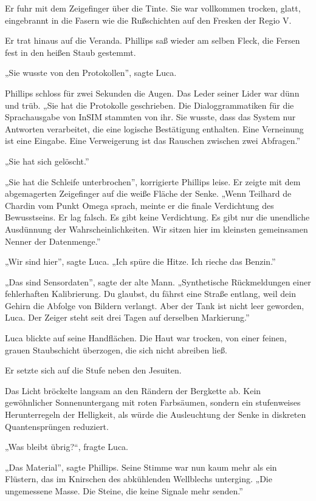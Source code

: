 \documentclass[
  ngerman,
]{article}
\begin{document}
Er fuhr mit dem Zeigefinger über die Tinte. Sie war vollkommen trocken,
glatt, eingebrannt in die Fasern wie die Rußschichten auf den Fresken
der Regio V.

Er trat hinaus auf die Veranda. Phillips saß wieder am selben Fleck, die
Fersen fest in den heißen Staub gestemmt.

„Sie wusste von den Protokollen'', sagte Luca.

Phillips schloss für zwei Sekunden die Augen. Das Leder seiner Lider war
dünn und trüb. „Sie hat die Protokolle geschrieben. Die
Dialoggrammatiken für die Sprachausgabe von InSIM stammten von ihr. Sie
wusste, dass das System nur Antworten verarbeitet, die eine logische
Bestätigung enthalten. Eine Verneinung ist eine Eingabe. Eine
Verweigerung ist das Rauschen zwischen zwei Abfragen.''

„Sie hat sich gelöscht.''

„Sie hat die Schleife unterbrochen'', korrigierte Phillips leise. Er
zeigte mit dem abgemagerten Zeigefinger auf die weiße Fläche der Senke.
„Wenn Teilhard de Chardin vom Punkt Omega sprach, meinte er die finale
Verdichtung des Bewusstseins. Er lag falsch. Es gibt keine Verdichtung.
Es gibt nur die unendliche Ausdünnung der Wahrscheinlichkeiten. Wir
sitzen hier im kleinsten gemeinsamen Nenner der Datenmenge.''

„Wir sind hier'', sagte Luca. „Ich spüre die Hitze. Ich rieche das
Benzin.''

„Das sind Sensordaten'', sagte der alte Mann. „Synthetische
Rückmeldungen einer fehlerhaften Kalibrierung. Du glaubst, du fährst
eine Straße entlang, weil dein Gehirn die Abfolge von Bildern verlangt.
Aber der Tank ist nicht leer geworden, Luca. Der Zeiger steht seit drei
Tagen auf derselben Markierung.''

Luca blickte auf seine Handflächen. Die Haut war trocken, von einer
feinen, grauen Staubschicht überzogen, die sich nicht abreiben ließ.

Er setzte sich auf die Stufe neben den Jesuiten.

Das Licht bröckelte langsam an den Rändern der Bergkette ab. Kein
gewöhnlicher Sonnenuntergang mit roten Farbsäumen, sondern ein
stufenweises Herunterregeln der Helligkeit, als würde die Ausleuchtung
der Senke in diskreten Quantensprüngen reduziert.

„Was bleibt übrig?{\kern0pt}``, fragte Luca.

„Das Material'', sagte Phillips. Seine Stimme war nun kaum mehr als ein
Flüstern, das im Knirschen des abkühlenden Wellblechs unterging. „Die
ungemessene Masse. Die Steine, die keine Signale mehr senden.''
\end{document}
